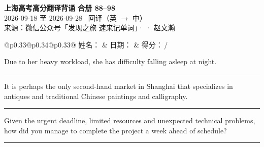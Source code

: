 \documentclass[11pt,a4paper]{article}
\newcommand{\num}[1]{\makebox[1.9em][r]{#1.}\hspace{0.3em}}
\newcommand{\wline}{\noindent\rule{\linewidth}{0.4pt}}
\begin{document}
\pagestyle{plain}
\begin{center}
{\LARGE\bfseries 上海高考高分翻译背诵 \quad 合册 88–98}\\[0.25em]
{\large 2026-09-18 至 2026-09-28 \quad\ 回译（英 $\to$ 中）}\\[0.35em]
{\footnotesize 来源：微信公众号「发现之旅 速来记单词」·  · 赵文瀚}
\end{center}

\vspace{0.4em}
\noindent\begin{tabular}{@{}p{0.33\textwidth}@{}p{0.34\textwidth}@{}p{0.33\textwidth}@{}}
姓名：\underline{\hspace{2.0cm}} & 日期：\underline{\hspace{2.0cm}} & 得分：\underline{\hspace{1.4cm}}\,/ \\
\end{tabular}

\vspace{0.5em}

\vspace{0.8em}
\vspace{0.35em}\vspace{0.15em}

\begin{minipage}{\linewidth}

\num{1}Due to her heavy workload, she has difficulty falling asleep at night.

\vspace{0.25em}

\wline

\end{minipage}

\begin{minipage}{\linewidth}

\num{2}It is perhaps the only second-hand market in Shanghai that specializes in antiques and traditional Chinese paintings and calligraphy.

\vspace{0.25em}

\wline

\end{minipage}

\begin{minipage}{\linewidth}

\num{3}Given the urgent deadline, limited resources and unexpected technical problems, how did you manage to complete the project a week ahead of schedule?

\vspace{0.25em}

\wline

\end{minipage}
\end{document}
